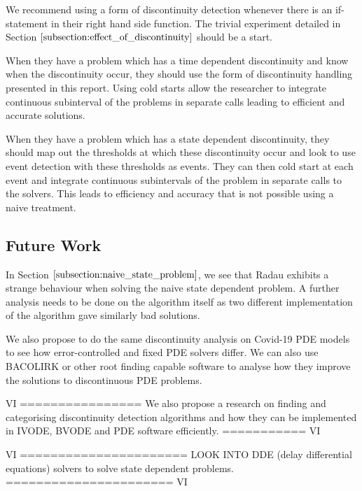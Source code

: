 We recommend using a form of discontinuity detection whenever there is an if-statement in their right hand side function. The trivial experiment detailed in Section $\ref{subsection:effect_of_discontinuity}$ should be a start.

When they have a problem which has a time dependent discontinuity and know when the discontinuity occur, they should use the form of discontinuity handling presented in this report. Using cold starts allow the researcher to integrate continuous subinterval of the problems in separate calls leading to efficient and accurate solutions.

When they have a problem which has a state dependent discontinuity, they should map out the thresholds at which these discontinuity occur and look to use event detection with these thresholds as events. They can then cold start at each event and integrate continuous subintervals of the problem in separate calls to the solvers. This leads to efficiency and accuracy that is not possible using a naive treatment. 

\subsection{Future Work}
\label{subsection:future_work}
In Section $\ref{subsection:naive_state_problem}$, we see that Radau exhibits a strange behaviour when solving the naive state dependent problem. A further analysis needs to be done on the algorithm itself as two different implementation of the algorithm gave similarly bad solutions.

We also propose to do the same discontinuity analysis on Covid-19 PDE models to see how error-controlled and fixed PDE solvers differ. We can also use BACOLIRK or other root finding capable software to analyse how they improve the solutions to discontinuous PDE problems.

VI ================
We also propose a research on finding and categorising discontinuity detection algorithms and how they can be implemented in IVODE, BVODE and PDE software efficiently.
=========== VI

VI ======================
LOOK INTO DDE (delay differential equations) solvers to solve state dependent problems.
====================== VI